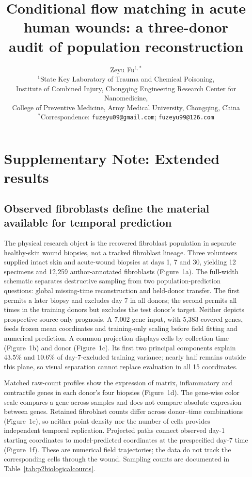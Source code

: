 \documentclass[10pt,a4paper]{article}
\title{Conditional flow matching in acute human wounds: a three-donor audit of population reconstruction}
\author{Zeyu Fu$^{1,*}$\\[3pt]\small $^1$State Key Laboratory of Trauma and Chemical Poisoning,\\\small Institute of Combined Injury, Chongqing Engineering Research Center for Nanomedicine,\\\small College of Preventive Medicine, Army Medical University, Chongqing, China\\\small $^*$Correspondence: \texttt{fuzeyu09@gmail.com}; \texttt{fuzeyu99@126.com}}\date{}
\begin{document}
\renewcommand{\thefigure}{S\arabic{figure}}
\maketitle\supplement
\section*{Supplementary Note: Extended results}
\subsection{Observed fibroblasts define the material available for temporal prediction}

The physical research object is the recovered fibroblast population in separate healthy-skin wound biopsies, not a tracked fibroblast lineage. Three volunteers supplied intact skin and acute-wound biopsies at days 1, 7 and 30, yielding 12 specimens and 12,259 author-annotated fibroblasts (Figure~1a\label{call:p2f1}). The full-width schematic separates destructive sampling from two population-prediction questions: global missing-time reconstruction and held-donor transfer. The first permits a later biopsy and excludes day 7 in all donors; the second permits all times in the training donors but excludes the test donor's target. Neither depicts prospective source-only prognosis. A 7,002-gene input, with 5,383 covered genes, feeds frozen mean coordinates and training-only scaling before field fitting and numerical prediction. A common projection displays cells by collection time (Figure~1b) and donor (Figure~1c). Its first two principal components explain 43.5\% and 10.6\% of day-7-excluded training variance; nearly half remains outside this plane, so visual separation cannot replace evaluation in all 15 coordinates.



Matched raw-count profiles show the expression of matrix, inflammatory and contractile genes in each donor's four biopsies (Figure~1d). The gene-wise color scale compares a gene across samples and does not compare absolute expression between genes. Retained fibroblast counts differ across donor--time combinations (Figure~1e), so neither point density nor the number of cells provides independent temporal replication. Projected paths connect observed day-1 starting coordinates to model-predicted coordinates at the prespecified day-7 time (Figure~1f). These are numerical field trajectories; the data do not track the corresponding cells through the wound. Sampling counts are documented in Table~\ref{tab:p2biologicalcounts}.
\end{document}
